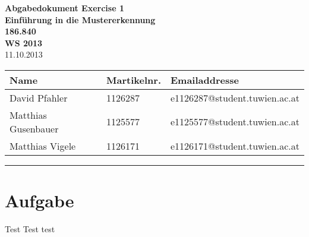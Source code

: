 \documentclass[12pt,a4paper,DIV=calc]{scrartcl} %
\title{\lvaname \dokumenttyp}
\author{David Pfahler\\ Matthias Gusenbauer\\ Matthias Vigele}
\date{\datum}
\newcommand{\datum}{11.10.2013}
\newcommand{\lab}{Exercise 1}
\newcommand{\dokumenttyp}{Abgabedokument \lab}
\newcommand{\lvaname}{Einführung in die Mustererkennung}
\newcommand{\lvanr}{186.840}
\newcommand{\semester}{WS 2013}
\begin{document}
\thispagestyle{firstpage}
\begin{center}
\vspace{1.5cm}
{\LARGE\bf \dokumenttyp\\}
\vspace{0.3cm}
{\LARGE\bf \lvaname\\\lvanr\\\semester\\}
\vspace{1.0cm}
{\LARGE \datum}
\vspace{1.5cm}
\end{center}



\begin{tabular}{|p{5.0cm}|p{2cm}|p{7.4cm}|}\hline
 \textbf{Name} &  \textbf{Martikelnr.} & \textbf{Emailaddresse}\\\hline
  David Pfahler & 1126287 & e1126287@student.tuwien.ac.at\\ \hline
	Matthias Gusenbauer & 1125577 & e1125577@student.tuwien.ac.at\\ \hline
	Matthias Vigele & 1126171 & e1126171@student.tuwien.ac.at\\ \hline

\end{tabular}

\vspace{1.5cm}


\vspace{0.3cm}
\rule{\textwidth}{0.1mm}
\vspace{0.3cm}


\newpage


\section{Aufgabe}
Test Test test
\end{document}
